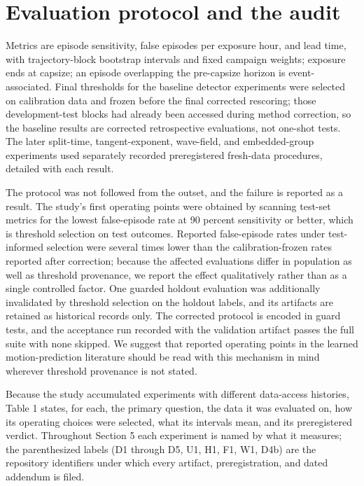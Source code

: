 \documentclass[11pt]{article}
\begin{document}
\section{Evaluation protocol and the audit}

Metrics are episode sensitivity, false episodes per exposure hour, and lead time, with
trajectory-block bootstrap intervals and fixed campaign weights; exposure ends at capsize; an
episode overlapping the pre-capsize horizon is event-associated. Final thresholds for the
baseline detector experiments were selected on calibration data and frozen before the final
corrected rescoring; those development-test blocks had already been accessed during method
correction, so the baseline results are corrected retrospective evaluations, not one-shot
tests. The later split-time, tangent-exponent, wave-field, and embedded-group experiments used
separately recorded preregistered fresh-data procedures, detailed with each result.

The protocol was not followed from the outset, and the failure is reported as a result. The
study's first operating points were obtained by scanning test-set metrics for the lowest
false-episode rate at 90 percent sensitivity or better, which is threshold selection on test
outcomes. Reported false-episode rates under test-informed selection were several times lower
than the calibration-frozen rates reported after correction; because the affected evaluations
differ in population as well as threshold provenance, we report the effect qualitatively rather
than as a single controlled factor. One guarded holdout evaluation was additionally invalidated
by threshold selection on the holdout labels, and its artifacts are retained as historical
records only. The corrected protocol is encoded in guard tests, and the acceptance run recorded
with the validation artifact passes the full suite with none skipped.
We suggest that reported operating points in the learned motion-prediction literature should be
read with this mechanism in mind wherever threshold provenance is not stated.

Because the study accumulated experiments with different data-access histories, Table 1 states,
for each, the primary question, the data it was evaluated on, how its operating choices were
selected, what its intervals mean, and its preregistered verdict. Throughout Section 5 each
experiment is named by what it measures; the parenthesized labels (D1 through D5, U1, H1, F1,
W1, D4b) are the repository identifiers under which every artifact, preregistration, and dated
addendum is filed.
\end{document}

